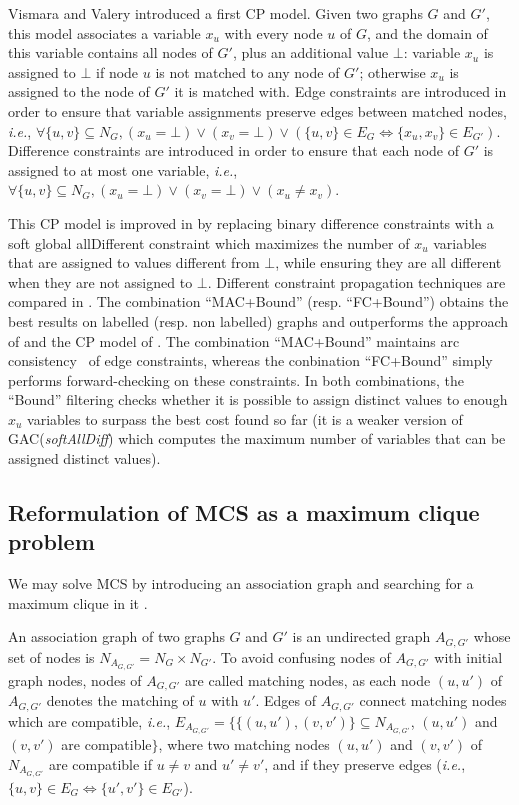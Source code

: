\documentclass{llncs}
\begin{document}
Vismara and Valery  \cite{DBLP:conf/mco/VismaraV08} introduced a first CP model. Given two graphs
$G$ and $G'$, this model associates a variable $x_u$ with every node $u$ of $G$, and the domain of
this variable contains all nodes of $G'$, plus an additional value $\bot$: variable $x_u$ is
assigned to $\bot$ if node $u$ is not matched to any node of $G'$; otherwise $x_u$ is assigned to
the node of $G'$ it is matched with. Edge constraints are introduced in order to ensure that
variable assignments preserve edges between matched nodes, {\em i.e.}, $\forall \{u,v\}\subseteq
N_G, (x_u=\bot)\vee (x_v=\bot) \vee (\{u,v\}\in E_G\Leftrightarrow \{x_u,x_v\}\in E_{G'})$.
Difference constraints are introduced in order to ensure that each node of $G'$ is assigned to at
most one variable, {\em i.e.}, $\forall \{u,v\}\subseteq N_G, (x_u=\bot)\vee (x_v=\bot) \vee
(x_u\neq x_v)$.

This CP model is improved in \cite{DBLP:conf/cp/NdiayeS11} by replacing binary difference
constraints with a soft global allDifferent constraint which maximizes the number of $x_u$ variables
that are assigned to values different from $\bot$, while ensuring they are all different when they
are not assigned to $\bot$.  Different constraint propagation techniques are compared in
\cite{DBLP:conf/cp/NdiayeS11}. The combination ``MAC+Bound'' (resp. ``FC+Bound'') obtains the best
results on labelled (resp. non labelled) graphs and outperforms the approach of \cite{McGreg82} and
the CP model of \cite{DBLP:conf/mco/VismaraV08}. The combination ``MAC+Bound'' maintains arc
consistency~\cite{sabi94} of edge constraints, whereas the conbination ``FC+Bound'' simply performs
forward-checking on these constraints. In both combinations, the ``Bound'' filtering checks whether
it is possible to assign distinct values to enough $x_u$ variables to surpass the best cost found so
far (it is a weaker version of GAC(\emph{softAllDiff}) \cite{peti01} which computes the maximum
number of variables that can be assigned distinct values).



\subsection{Reformulation of MCS as a maximum clique problem}
\label{clique}

We may solve MCS by introducing an association graph and searching for a maximum clique in it
\cite{bala86,dura99,DBLP:journals/jcamd/RaymondW02a}.

An association graph of two graphs $G$ and $G'$ is an undirected graph $A_{G,G'}$ whose set of nodes
is $N_{A_{G,G'}} = N_G \times N_{G'}$. To avoid confusing nodes of $A_{G,G'}$ with initial graph
nodes, nodes of $A_{G,G'}$ are called matching nodes, as each node $(u,u')$ of $A_{G,G'}$ denotes
the matching of $u$ with $u'$. Edges of $A_{G,G'}$ connect matching nodes which are compatible, {\em
i.e.}, $E_{A_{G,G'}} = \big\{\{(u,u'),(v,v')\}\subseteq N_{A_{G,G'}}$, $(u,u')$ and $(v,v')$ are
compatible$\big\}$, where two matching nodes $(u,u')$ and $(v,v')$ of $N_{A_{G,G'}}$ are compatible
if $u \neq v$ and $u' \neq v'$, and if they preserve edges (\emph{i.e.}, $\{u,v\} \in E_G
\Leftrightarrow \{u',v'\} \in E_{G'}$).
\end{document}
